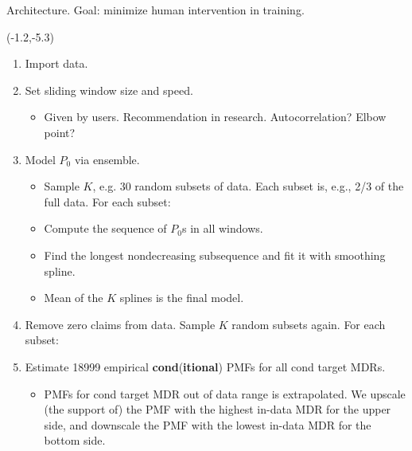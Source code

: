 \documentclass[aspectratio=169]{beamer}
\begin{document}
\begin{frame}{\normalsize Architecture. Goal: minimize human intervention in training.}
\begin{textblock}{7.5}(-1.2,-5.3)
\begin{enumerate}
\tiny\item Import data.

\tiny\item Set sliding window size and speed.\smallskip

\begin{itemize}
\tiny\item Given by users. Recommendation in research. Autocorrelation? Elbow point?\smallskip%
\end{itemize}

\tiny\item Model $P_0$ via ensemble.\smallskip

\begin{itemize}
\tiny\item Sample $K$, e.g. 30 random subsets of data. Each subset is, e.g., 2/3 of the full data. For each subset:\smallskip%

\tiny\item Compute the sequence of $P_0$s in all windows.\smallskip%

\tiny\item Find the longest nondecreasing subsequence and fit it with smoothing spline.\smallskip%

\tiny\item Mean of the $K$ splines is the final model.\smallskip%
\end{itemize}

\tiny\item Remove zero claims from data. Sample $K$ random subsets again. For each subset:\smallskip

\tiny\item Estimate 18999 empirical \textbf{cond}(\textbf{itional}) PMFs for all cond target MDRs.\smallskip%

\begin{itemize}
\tiny\item PMFs for cond target MDR out of data range is extrapolated. We upscale (the support of) the PMF with the highest in-data MDR for the upper side, and downscale the PMF with the lowest in-data MDR for the bottom side.\smallskip%


\end{itemize}
\end{enumerate}
\end{textblock}
\end{frame}
\end{document}
